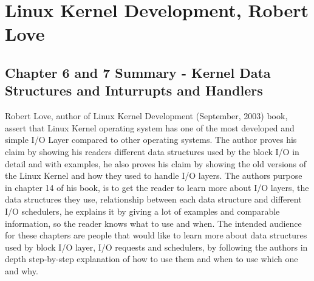 \documentclass[letterpaper,10pt,draftclsnofoot,onecolumn]{IEEEtran}
\begin{document}


	
\section*{Linux Kernel Development, Robert Love}
\subsection*{Chapter 6 and 7 Summary - Kernel Data Structures and Inturrupts and Handlers}

Robert Love, author of Linux Kernel Development (September, 2003) book, assert that Linux Kernel operating system has one of the most developed and simple I/O Layer compared to other operating systems. The author proves his claim by showing his readers different data structures used by the block I/O in detail and with examples, he also proves his claim by showing the old versions of the Linux Kernel and how they used to handle I/O layers. The author\textquotesingle s purpose in chapter 14 of his book, is to get the reader to learn more about I/O layers, the data structures they use, relationship between each data structure and different I/O schedulers, he explains it by giving a lot of examples and comparable information, so the reader knows what to use and when. The intended audience for these chapters are people that would like to learn more about data structures used by block I/O layer, I/O requests and schedulers, by following the author\textquotesingle s in depth step-by-step explanation of how to use them and when to use which one and why.
\end{document}
